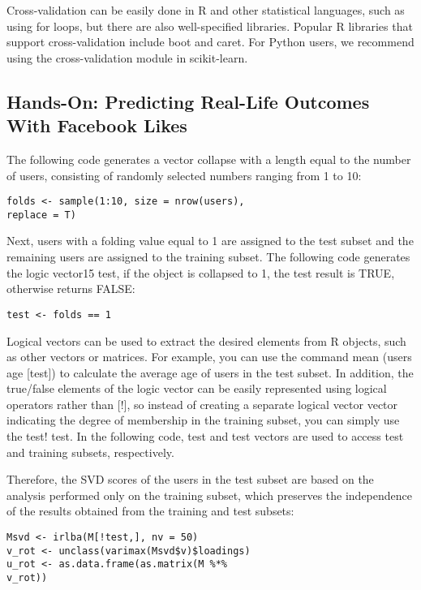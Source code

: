 Cross-validation can be easily done in R and other statistical 
languages, such as using for loops, but there are also 
well-specified libraries. Popular R libraries that support 
cross-validation include boot and caret. For Python users, we 
recommend using the cross-validation module in scikit-learn.

\subsection{Hands-On: Predicting Real-Life Outcomes With
Facebook Likes}

The following code generates a vector collapse with a length equal
 to the number of users, consisting of randomly selected numbers 
ranging from 1 to 10:

\begin{verbatim}
folds <- sample(1:10, size = nrow(users),
replace = T)
\end{verbatim}

Next, users with a folding value equal to 1 are assigned to the 
test subset and the remaining users are assigned to the training 
subset. The following code generates the logic vector15 test, if 
the object is collapsed to 1, the test result is TRUE, otherwise 
returns FALSE:

\begin{verbatim}
test <- folds == 1
\end{verbatim}

Logical vectors can be used to extract the desired elements from R
 objects, such as other vectors or matrices. For example, you can 
use the command mean (users age [test]) to calculate the average age
 of users in the test subset. In addition, the true/false elements
 of the logic vector can be easily represented using logical 
operators rather than [!], so instead of creating a separate 
logical vector vector indicating the degree of membership in the 
training subset, you can simply use the test! test. In the 
following code, test and test vectors are used to access test and 
training subsets, respectively.

Therefore, the SVD scores of the users in the test subset are based
 on the analysis performed only on the training subset, which 
preserves the independence of the results obtained from the 
training and test subsets:

\begin{verbatim}
Msvd <- irlba(M[!test,], nv = 50)
v_rot <- unclass(varimax(Msvd$v)$loadings)
u_rot <- as.data.frame(as.matrix(M %*%
v_rot))
\end{verbatim}

